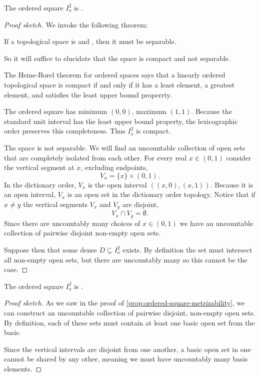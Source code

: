 \documentclass[11pt]{article}
\begin{document}
\begin{prop}\label{prop:ordered-square-metrizability}
    The ordered square $I^2_o$ is 
    . 
\end{prop}
\begin{proof}[Proof sketch]
    We invoke the following theorem: 
    \begin{thm*}
        If a topological space is  
        and , 
        then it must be separable. 
    \end{thm*}

    So it will suffice to elucidate that the space 
    is compact and not separable. 

    The Heine-Borel theorem for ordered spaces says that 
    a linearly ordered topological space is compact if 
    and only if it has a least element, a greatest 
    element, and satisfies the least upper 
    bound properrty. 

    The ordered square has minimum $(0,0)$, 
    maximum $(1,1)$. 
    Because the standard unit interval has 
    the least upper bound property, the lexicographic 
    order preserves this completeness. 
    Thus $I_o^2$ is compact. 

    The space is not separable. 
    We will find an uncountable 
    collection of open sets that are completely 
    isolated from each other. 
    For every real $x \in (0,1)$ consider the 
    vertical segment at $x$, excluding endpoints, 
    \[
        V_x = \{x\} \times (0,1). 
    \]
    In the dictionary order, $V_x$ is the 
    open interval $((x,0), (x,1))$. Because it is an 
    open interval, $V_x$ is an open set in the dictionary 
    order topology. 
    Notice that if $x \neq y$ the vertical segments 
    $V_x$ and $V_y$ are disjoint, 
    \[
        V_x \cap V_y = \emptyset. 
    \]
    Since there are uncountably many choices 
    of $x \in (0,1)$ we have an uncountable 
    collection of pairwise disjoint non-empty 
    open sets. 

    Suppose then that some 
    dense $D \subseteq I_o^2$ exists. 
    By definition the set must intersect 
    all non-empty open sets, but there are uncountably 
    many so this cannot be the case. 

\end{proof}

\begin{prop}\label{prop:ordered_square_second_countability}
    The ordered square $I_o^2$ is 
    .
\end{prop}
\begin{proof}[Proof sketch]
    As we saw in the proof of 
    \cref{prop:ordered-square-metrizability}, 
    we can construct an uncountable 
    collection of pairwise disjoint, non-empty 
    open sets. 
    By definition, each of these 
    sets must contain at least 
    one basic open set from the basis. 

    Since the vertical intervals are disjoint 
    from one another, a basic open set 
    in one cannot be shared by any other, 
    meaning we must have uncountably many basis elements. 
\end{proof}
\end{document}
